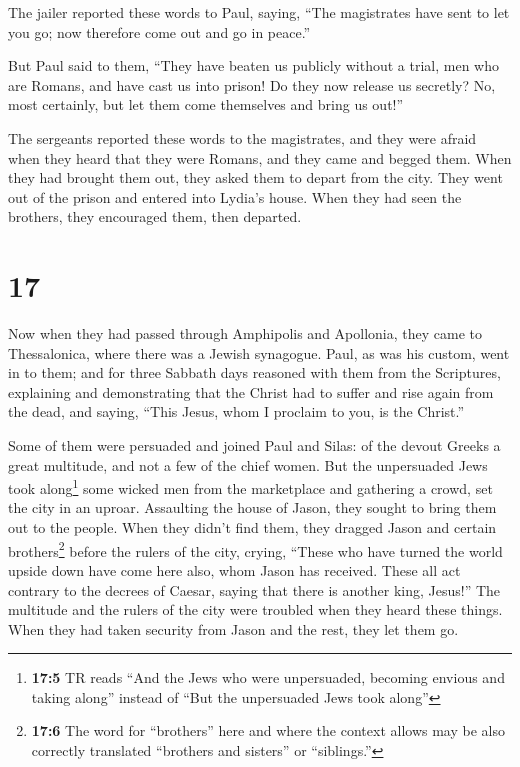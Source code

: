  The jailer reported these words to Paul, saying, ``The
magistrates have sent to let you go; now therefore come out and go in
peace.''

 But Paul said to them, ``They have beaten us publicly
without a trial, men who are Romans, and have cast us into prison! Do
they now release us secretly? No, most certainly, but let them come
themselves and bring us out!''

 The sergeants reported these words to the magistrates,
and they were afraid when they heard that they were Romans,
 and they came and begged them. When they had brought
them out, they asked them to depart from the city.  They
went out of the prison and entered into Lydia's house. When they had
seen the brothers, they encouraged them, then departed.

\hypertarget{section-16}{%
\section{17}\label{section-16}}

 Now when they had passed through Amphipolis and
Apollonia, they came to Thessalonica, where there was a Jewish
synagogue.  Paul, as was his custom, went in to them; and
for three Sabbath days reasoned with them from the Scriptures,
 explaining and demonstrating that the Christ had to
suffer and rise again from the dead, and saying, ``This Jesus, whom I
proclaim to you, is the Christ.''

 Some of them were persuaded and joined Paul and Silas: of
the devout Greeks a great multitude, and not a few of the chief women.
 But the unpersuaded Jews took along\footnote{\textbf{17:5}
  TR reads ``And the Jews who were unpersuaded, becoming envious and
  taking along'' instead of ``But the unpersuaded Jews took along''}
some wicked men from the marketplace and gathering a crowd, set the city
in an uproar. Assaulting the house of Jason, they sought to bring them
out to the people.  When they didn't find them, they
dragged Jason and certain brothers\footnote{\textbf{17:6} The word for
  ``brothers'' here and where the context allows may be also correctly
  translated ``brothers and sisters'' or ``siblings.''} before the
rulers of the city, crying, ``These who have turned the world upside
down have come here also,  whom Jason has received. These
all act contrary to the decrees of Caesar, saying that there is another
king, Jesus!''  The multitude and the rulers of the city
were troubled when they heard these things.  When they had
taken security from Jason and the rest, they let them go.

